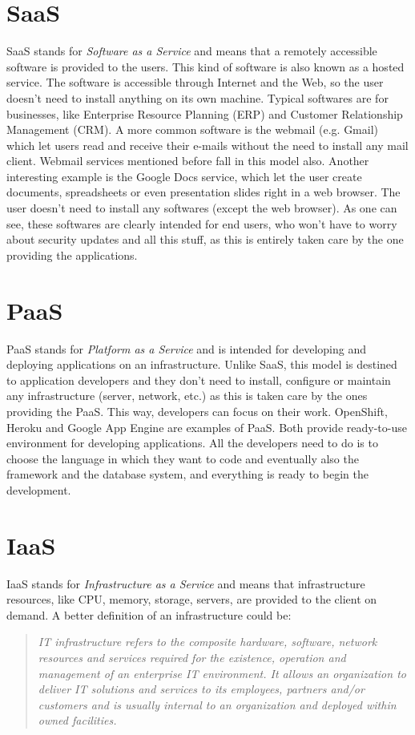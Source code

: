 \section{SaaS}
SaaS stands for \textit{Software as a Service} and means that a remotely accessible software is provided to the users. 
This kind of software is also known as a hosted service. 
The software is accessible through Internet and the Web, so the user doesn't need to install anything on its own machine. 
Typical softwares are for businesses, like Enterprise Resource Planning (ERP) and Customer Relationship Management (CRM). 
A more common software is the webmail (e.g. Gmail) which let users read and receive their e-mails without the need to install any mail client. 
Webmail services mentioned before fall in this model also. 
Another interesting example is the Google Docs service, which let the user create documents, spreadsheets or even presentation slides right in a web browser. 
The user doesn't need to install any softwares (except the web browser). 
As one can see, these softwares are clearly intended for end users, who won't have to worry about security updates and all this stuff, as this is entirely taken care by the one providing the applications.





\section{PaaS}
PaaS stands for \textit{Platform as a Service} and is intended for developing and deploying applications on an infrastructure. 
Unlike SaaS, this model is destined to application developers and they don't need to install, configure or maintain any infrastructure (server, network, etc.) as this is taken care by the ones providing the PaaS. 
This way, developers can focus on their work. 
OpenShift, Heroku and Google App Engine are examples of PaaS.
Both provide ready-to-use environment for developing applications.
All the developers need to do is to choose the language in which they want to code and eventually also the framework and the database system, and everything is ready to begin the development.





\section{IaaS}
IaaS stands for \textit{Infrastructure as a Service} and means that infrastructure resources, like CPU, memory, storage, servers, are provided to the client on demand. A better definition of an infrastructure could be:
\begin{quotation}
\textit{
IT infrastructure refers to the composite hardware, software, network resources and services required for the existence, operation and management of an enterprise IT environment. It allows an organization to deliver IT solutions and services to its employees, partners and/or customers and is usually internal to an organization and deployed within owned facilities.
}\cite{cjanssen14}
\end{quotation}

